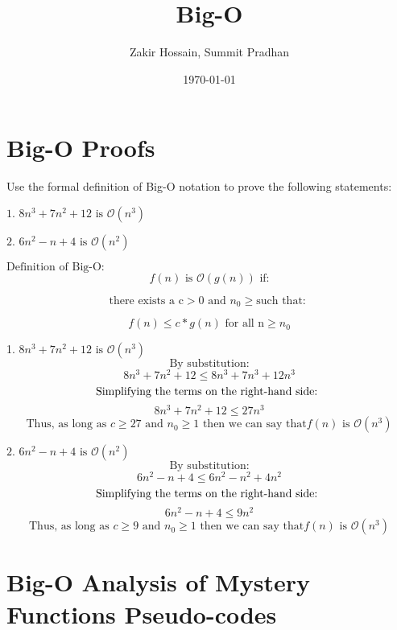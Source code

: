 \documentclass{article}
\title{Big-O}
\author{Zakir Hossain, Summit Pradhan}
\date{\today}
\begin{document}
\maketitle

\section{Big-O Proofs}
\text Use the formal definition of Big-O notation to prove the following statements:

${\text{1. } 8n^3 + 7n^2 + 12 \text{ is } \mathcal{O}(n^3)}$

${\text{2. } 6n^2 -n + 4 \text{ is } \mathcal{O}(n^2)}$\linebreak

$\text{Definition of Big-O}:$
$$f(n) \text{ is } \mathcal{O}(g(n)) \text{ if:}$$

$$\text{there exists a c} > 0 \text{ and } n_0 \ge \text{such that: } $$

$${f(n) \le c*g(n) \text{ for all n} \ge n_0}$$\linebreak

1. $8n^3 + 7n^2 + 12 \text{ is } \mathcal{O}(n^3)$
$$\text{By substitution:}$$
$$ 8n^3 + 7n^2 + 12 \le 8n^3 + 7n^3 + 12n^3 $$
$$\text{Simplifying the terms on the right-hand side: \linebreak}$$
$$ 8n^3 + 7n^2 + 12 \le 27n^3 $$
$$\text{Thus, as long as } c \ge 27 \text{ and } n_0 \ge 1 \text{ then we can say that} f(n) \text{ is } \mathcal{O}(n^3)$$

${\text{2. } 6n^2 -n + 4 \text{ is } \mathcal{O}(n^2)}$\linebreak
$$\text{By substitution:}$$
$$ 6n^2 -n + 4 \le 6n^2 -n^2 + 4n^2$$
$$\text{Simplifying the terms on the right-hand side: \linebreak}$$
$$ 6n^2 -n + 4 \le 9n^2 $$
$$\text{Thus, as long as } c \ge 9 \text{ and } n_0 \ge 1 \text{ then we can say that} f(n) \text{ is } \mathcal{O}(n^3)$$

\pagebreak
\section{Big-O Analysis of Mystery Functions Pseudo-codes}
\end{document}
